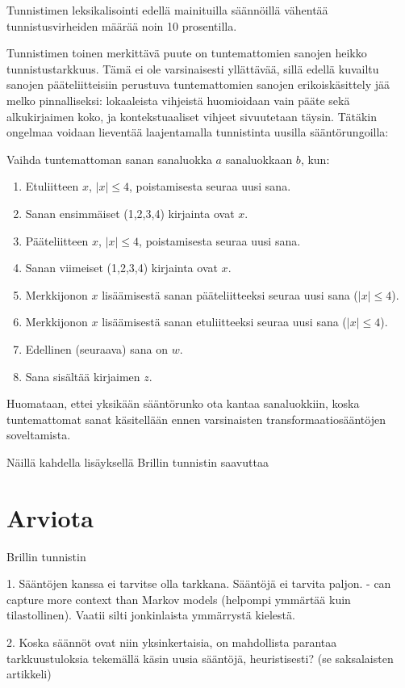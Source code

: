 \documentclass[utf8,bachelor,manualbib]{gradu3}
\begin{document}
Tunnistimen leksikalisointi edellä mainituilla säännöillä vähentää tunnistusvirheiden määrää noin 10 prosentilla. \citep{brill1994}

Tunnistimen toinen merkittävä puute on tuntemattomien sanojen heikko tunnistustarkkuus. Tämä ei ole varsinaisesti yllättävää, sillä edellä kuvailtu sanojen pääteliitteisiin perustuva tuntemattomien sanojen erikoiskäsittely jää melko pinnalliseksi: lokaaleista vihjeistä huomioidaan vain pääte sekä alkukirjaimen koko, ja kontekstuaaliset vihjeet sivuutetaan täysin. Tätäkin ongelmaa voidaan lieventää laajentamalla tunnistinta uusilla sääntörungoilla: 

Vaihda tuntemattoman sanan sanaluokka $a$ sanaluokkaan $b$, kun:

\begin{enumerate}
\item Etuliitteen $x$, $|x| \leq 4$, poistamisesta seuraa uusi sana.
\item Sanan ensimmäiset (1,2,3,4) kirjainta ovat $x$. 
\item Pääteliitteen $x$, $|x| \leq 4$, poistamisesta seuraa uusi sana.
\item Sanan viimeiset (1,2,3,4) kirjainta ovat $x$. 
\item Merkkijonon $x$ lisäämisestä sanan pääteliitteeksi seuraa uusi sana ($|x| \leq 4$).
\item Merkkijonon $x$ lisäämisestä sanan etuliitteeksi seuraa uusi sana ($|x| \leq 4$).
\item Edellinen (seuraava) sana on $w$.
\item Sana sisältää kirjaimen $z$.
\end{enumerate}

Huomataan, ettei yksikään sääntörunko ota kantaa sanaluokkiin, koska tuntemattomat sanat käsitellään ennen varsinaisten transformaatiosääntöjen soveltamista. \citep{brill1994}

Näillä kahdella lisäyksellä Brillin tunnistin saavuttaa 

\section{Arviota}
Brillin tunnistin 

1. Sääntöjen kanssa ei tarvitse olla tarkkana. Sääntöjä ei tarvita paljon. - can capture more context than Markov models (helpompi ymmärtää kuin tilastollinen). Vaatii silti jonkinlaista ymmärrystä kielestä.

2. Koska säännöt ovat niin yksinkertaisia, on mahdollista parantaa tarkkuustuloksia tekemällä käsin uusia sääntöjä, heuristisesti? (se saksalaisten artikkeli)
\end{document}
